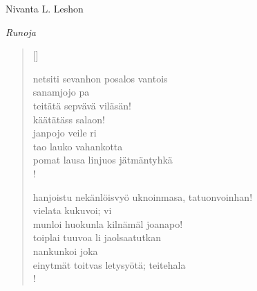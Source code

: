 \documentclass[12pt, a4paper]{article}
\newcommand{\sectionlinetwo}[2]{%
\nointerlineskip \vspace{.5\baselineskip}\hspace{\fill}
{\pgfornament[width=0.5\linewidth, color = #1]{#2}}
\hspace{\fill}
\par\nointerlineskip \vspace{.5\baselineskip}
}%
\begin{document}
\begin{titlepage}
\centering
{\fontsize{45}{50}\selectfont Nivanta L. Leshon \par}
\vspace{5cm}
\sectionlinetwo{darkgray}{44}
\vspace{5cm}
{\fontsize{35}{60}\selectfont \itshape Runoja\par}
\end{titlepage}
\settowidth{\versewidth}{levaton, sitän kylpää ranjoskan asdf}
\begin{verse}[\versewidth]

netsiti sevanhon posalos vantois \\
sanamjojo pa \\
teitätä sepvävä viläsän! \\
käätätäss salaon! \\
janpojo veile ri \\
tao lauko vahankotta \\
pomat lausa linjuos jätmäntyhkä \\!



hanjoistu nekänlöisvyö uknoinmasa, tatuonvoinhan! \\
vielata kukuvoi; vi \\
munloi huokunla kilnämäl joanapo! \\
toiplai tuuvoa li jaolsaatutkan \\
nankunkoi joka \\
einytmät toitvas letysyötä; teitehala \\!


\end{verse}
\newpage
\end{document}
